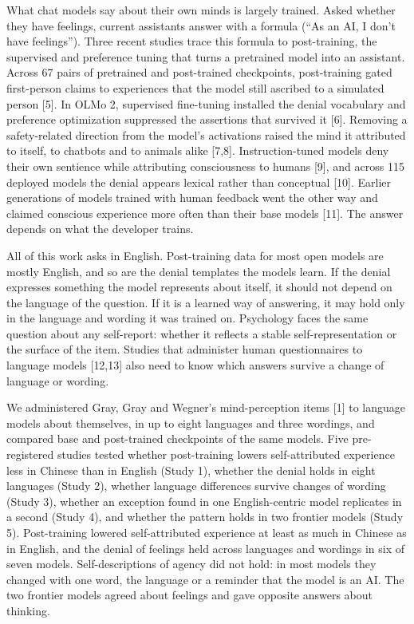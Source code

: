 \documentclass[
  11pt,
]{article}
\begin{document}
What chat models say about their own minds is largely trained. Asked
whether they have feelings, current assistants answer with a formula
(``As an AI, I don't have feelings''). Three recent studies trace this
formula to post-training, the supervised and preference tuning that
turns a pretrained model into an assistant. Across 67 pairs of
pretrained and post-trained checkpoints, post-training gated
first-person claims to experiences that the model still ascribed to a
simulated person {[}5{]}. In OLMo 2, supervised fine-tuning installed
the denial vocabulary and preference optimization suppressed the
assertions that survived it {[}6{]}. Removing a safety-related direction
from the model's activations raised the mind it attributed to itself, to
chatbots and to animals alike {[}7,8{]}. Instruction-tuned models deny
their own sentience while attributing consciousness to humans {[}9{]},
and across 115 deployed models the denial appears lexical rather than
conceptual {[}10{]}. Earlier generations of models trained with human
feedback went the other way and claimed conscious experience more often
than their base models {[}11{]}. The answer depends on what the
developer trains.

All of this work asks in English. Post-training data for most open
models are mostly English, and so are the denial templates the models
learn. If the denial expresses something the model represents about
itself, it should not depend on the language of the question. If it is a
learned way of answering, it may hold only in the language and wording
it was trained on. Psychology faces the same question about any
self-report: whether it reflects a stable self-representation or the
surface of the item. Studies that administer human questionnaires to
language models {[}12,13{]} also need to know which answers survive a
change of language or wording.

We administered Gray, Gray and Wegner's mind-perception items {[}1{]} to
language models about themselves, in up to eight languages and three
wordings, and compared base and post-trained checkpoints of the same
models. Five pre-registered studies tested whether post-training lowers
self-attributed experience less in Chinese than in English (Study 1),
whether the denial holds in eight languages (Study 2), whether language
differences survive changes of wording (Study 3), whether an exception
found in one English-centric model replicates in a second (Study 4), and
whether the pattern holds in two frontier models (Study 5).
Post-training lowered self-attributed experience at least as much in
Chinese as in English, and the denial of feelings held across languages
and wordings in six of seven models. Self-descriptions of agency did not
hold: in most models they changed with one word, the language or a
reminder that the model is an AI. The two frontier models agreed about
feelings and gave opposite answers about thinking.
\end{document}
